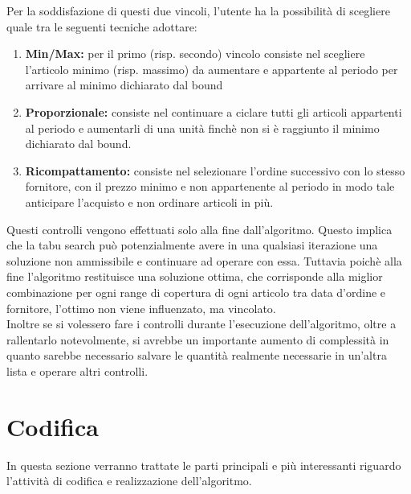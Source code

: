 Per la soddisfazione di questi due vincoli, l'utente ha la
possibilità di scegliere quale tra le seguenti tecniche adottare:
\begin{enumerate}
    \item \textbf{Min/Max:} per il primo (risp. secondo) vincolo
    consiste nel scegliere l'articolo minimo (risp. massimo)
    da aumentare e appartente al periodo per arrivare al
    minimo dichiarato dal bound
    \item \textbf{Proporzionale:} consiste nel continuare a ciclare
    tutti gli articoli appartenti al periodo e aumentarli di
    una unità finchè non si è raggiunto il minimo
    dichiarato dal bound.
    \item \textbf{Ricompattamento:} consiste nel selezionare l'ordine
    successivo con lo stesso fornitore, con il prezzo minimo e
    non appartenente al periodo in modo tale anticipare l'acquisto
    e non ordinare articoli in più.
\end{enumerate}
\vspace*{0.5cm}
\noindent Questi controlli vengono effettuati solo alla fine dall'algoritmo.
Questo implica che la tabu search può potenzialmente avere in
una qualsiasi iterazione una soluzione non ammissibile e
continuare ad operare con essa. Tuttavia poichè alla fine
l'algoritmo restituisce una soluzione ottima, che corrisponde
alla miglior combinazione per ogni range di copertura di
ogni articolo tra data d'ordine e fornitore, l'ottimo non viene
influenzato, ma vincolato.\\
Inoltre se si volessero fare i controlli durante l'esecuzione dell'algoritmo,
oltre a rallentarlo notevolmente, si avrebbe un importante aumento di
complessità in quanto sarebbe necessario salvare le quantità realmente
necessarie in un'altra lista e operare altri controlli.

\newpage

\section{Codifica}
\label{sec:codifica}
\noindent In questa sezione verranno trattate le parti principali e più interessanti riguardo l'attività
di codifica e realizzazione dell'algoritmo.

